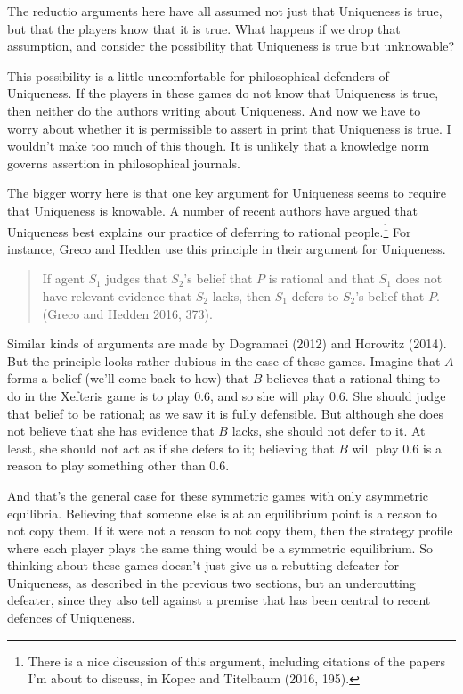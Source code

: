 \documentclass[12pt,]{article}
\let\rmarkdownfootnote\footnote%
\def\footnote{\protect\rmarkdownfootnote}
\begin{document}
The reductio arguments here have all assumed not just that Uniqueness is true, but that the players know that it is true. What happens if we drop that assumption, and consider the possibility that Uniqueness is true but unknowable?

This possibility is a little uncomfortable for philosophical defenders of Uniqueness. If the players in these games do not know that Uniqueness is true, then neither do the authors writing about Uniqueness. And now we have to worry about whether it is permissible to assert in print that Uniqueness is true. I wouldn't make too much of this though. It is unlikely that a knowledge norm governs assertion in philosophical journals.

The bigger worry here is that one key argument for Uniqueness seems to require that Uniqueness is knowable. A number of recent authors have argued that Uniqueness best explains our practice of deferring to rational people.\footnote{There is a nice discussion of this argument, including citations of the papers I'm about to discuss, in Kopec and Titelbaum (2016, 195).} For instance, Greco and Hedden use this principle in their argument for Uniqueness.

\begin{quote}
If agent \(S_1\) judges that \(S_2\)'s belief that \(P\) is rational and that \(S_1\) does not have relevant evidence that \(S_2\) lacks, then \(S_1\) defers to \(S_2\)'s belief that \(P\). (Greco and Hedden 2016, 373).
\end{quote}

Similar kinds of arguments are made by Dogramaci (2012) and Horowitz (2014). But the principle looks rather dubious in the case of these games. Imagine that \(A\) forms a belief (we'll come back to how) that \(B\) believes that a rational thing to do in the Xefteris game is to play 0.6, and so she will play 0.6. She should judge that belief to be rational; as we saw it is fully defensible. But although she does not believe that she has evidence that \(B\) lacks, she should not defer to it. At least, she should not act as if she defers to it; believing that \(B\) will play 0.6 is a reason to play something other than 0.6.

And that's the general case for these symmetric games with only asymmetric equilibria. Believing that someone else is at an equilibrium point is a reason to not copy them. If it were not a reason to not copy them, then the strategy profile where each player plays the same thing would be a symmetric equilibrium. So thinking about these games doesn't just give us a rebutting defeater for Uniqueness, as described in the previous two sections, but an undercutting defeater, since they also tell against a premise that has been central to recent defences of Uniqueness.
\end{document}
